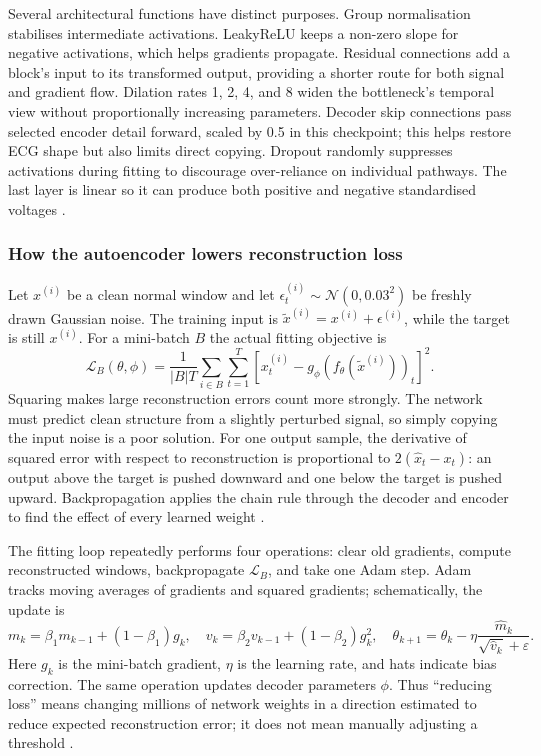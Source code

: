 Several architectural functions have distinct purposes. Group normalisation
stabilises intermediate activations. LeakyReLU keeps a non-zero slope for
negative activations, which helps gradients propagate. Residual connections
add a block's input to its transformed output, providing a shorter route for
both signal and gradient flow. Dilation rates 1, 2, 4, and 8 widen the
bottleneck's temporal view without proportionally increasing parameters.
Decoder skip connections pass selected encoder detail forward, scaled by
0.5 in this checkpoint; this helps restore ECG shape but also limits direct
copying. Dropout randomly suppresses activations during fitting to discourage
over-reliance on individual pathways. The last layer is linear so it can
produce both positive and negative standardised voltages
\cite{he2016resnet,ronneberger2015unet,srivastava2014dropout}.

\subsubsection{How the autoencoder lowers reconstruction loss}

Let $x^{(i)}$ be a clean normal window and let
$\epsilon^{(i)}_t\sim\mathcal{N}(0,0.03^2)$ be freshly drawn Gaussian noise.
The training input is $\widetilde x^{(i)}=x^{(i)}+\epsilon^{(i)}$, while the
target is still $x^{(i)}$. For a mini-batch $B$ the actual fitting objective is
\begin{equation}
 \mathcal{L}_{B}(\theta,\phi)=
 \frac{1}{|B|T}\sum_{i\in B}\sum_{t=1}^{T}
 \left[x^{(i)}_t-g_{\phi}(f_{\theta}(\widetilde x^{(i)}))_t\right]^2.
 \label{eq:theory-denoising-loss}
\end{equation}
Squaring makes large reconstruction errors count more strongly. The network
must predict clean structure from a slightly perturbed signal, so simply
copying the input noise is a poor solution. For one output sample, the
derivative of squared error with respect to reconstruction is proportional to
$2(\hat x_t-x_t)$: an output above the target is pushed downward and one below
the target is pushed upward. Backpropagation applies the chain rule through
the decoder and encoder to find the effect of every learned weight
\cite{vincent2008denoising}.

The fitting loop repeatedly performs four operations: clear old gradients,
compute reconstructed windows, backpropagate $\mathcal{L}_{B}$, and take one
Adam step. Adam tracks moving averages of gradients and squared gradients;
schematically, the update is
\begin{equation}
 m_k=\beta_1m_{k-1}+(1-\beta_1)g_k,\quad
 v_k=\beta_2v_{k-1}+(1-\beta_2)g_k^2,\quad
 \theta_{k+1}=\theta_k-\eta\frac{\widehat m_k}
 {\sqrt{\widehat v_k}+\varepsilon}.
 \label{eq:theory-adam}
\end{equation}
Here $g_k$ is the mini-batch gradient, $\eta$ is the learning rate, and hats
indicate bias correction. The same operation updates decoder parameters
$\phi$. Thus ``reducing loss'' means changing millions of network weights in
a direction estimated to reduce expected reconstruction error; it does not
mean manually adjusting a threshold \cite{kingma2015adam}.


